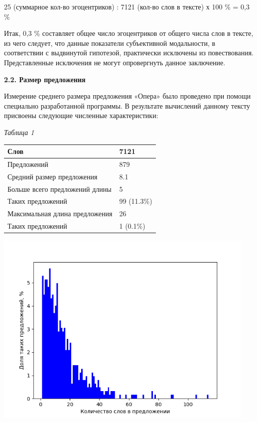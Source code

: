 \documentclass{kursa4}
\begin{document}
    {25 (суммарное кол-во эгоцентриков) : 7121 (кол-во
    слов в тексте) х 100 \% = 0,3 \%}

    {Итак, 0,3 \% составляет общее число эгоцентриков
    от общего числа слов в }{тексте, из чего следует, что
    данные показатели субъективной модальности, в соответствии с выдвинутой
    гипотезой, практически исключены из повествования. Представленные
    исключения не могут опровергнуть данное заключение. }

    {\bfseries
    \hypertarget{6x9n2xxxrm3g}{}2.2. Размер предложения}

    {Измерение среднего размера предложения «Опера»
    было проведено при помощи специально разработанной программы. В
    результате вычислений данному тексту присвоены следующие численные
    характеристики:}

    {\centering
    \textit{{Таблица 1}}
    \par}

    \begin{center}
    \tablehead{}
    \begin{supertabular}{|m{5.767cm}|m{1.8599999cm}|}
    \hline
    Слов &
    7121\\\hline
    Предложений &
    879\\\hline
    Средний размер предложения &
    8.1\\\hline
    Больше всего предложений длины &
    5\\\hline
    Таких предложений &
    99 (11.3\%)\\\hline
    Максимальная длина предложения &
    26\\\hline
    Таких предложений &
    1 (0.1\%)\\\hline
    \end{supertabular}
    \end{center}
    {\centering 
    \includegraphics[width=12.564cm,height=9.449cm]{irmw2lnohyper-img1.png}
    \par}
\end{document}
